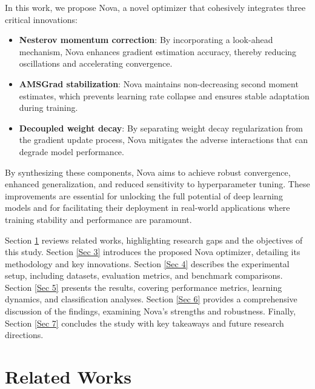 \documentclass{article}
\begin{document}
In this work, we propose Nova, a novel optimizer that cohesively integrates three critical innovations:
\begin{itemize}
    \item \textbf{Nesterov momentum correction}: By incorporating a look-ahead mechanism, Nova enhances gradient estimation accuracy, thereby reducing oscillations and accelerating convergence.
    \item \textbf{AMSGrad stabilization}: Nova maintains non-decreasing second moment estimates, which prevents learning rate collapse and ensures stable adaptation during training.
    \item \textbf{Decoupled weight decay}: By separating weight decay regularization from the gradient update process, Nova mitigates the adverse interactions that can degrade model performance.
\end{itemize}

By synthesizing these components, Nova aims to achieve robust convergence, enhanced generalization, and reduced sensitivity to hyperparameter tuning. These improvements are essential for unlocking the full potential of deep learning models and for facilitating their deployment in real-world applications where training stability and performance are paramount.

Section \ref{Sec 2} reviews related works, highlighting research gaps and the objectives of this study. Section \ref{Sec 3} introduces the proposed Nova optimizer, detailing its methodology and key innovations. Section \ref{Sec 4} describes the experimental setup, including datasets, evaluation metrics, and benchmark comparisons. Section \ref{Sec 5} presents the results, covering performance metrics, learning dynamics, and classification analyses. Section \ref{Sec 6} provides a comprehensive discussion of the findings, examining Nova’s strengths and robustness. Finally, Section \ref{Sec 7} concludes the study with key takeaways and future research directions.
\newpage


\section{Related Works}\label{Sec 2}
\end{document}
